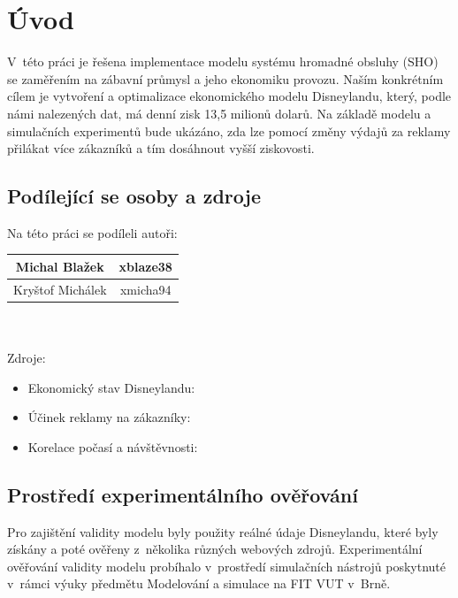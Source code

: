 
%

\chapter{Úvod}
V~této práci je řešena implementace modelu systému hromadné obsluhy (SHO) se zaměřením na zábavní průmysl a jeho ekonomiku provozu. Naším konkrétním cílem je vytvoření a optimalizace ekonomického modelu Disneylandu, který, podle námi nalezených dat, má denní zisk 13,5 milionů dolarů. Na základě modelu a simulačních experimentů bude ukázáno, zda lze pomocí změny výdajů za reklamy přilákat více zákazníků a tím dosáhnout vyšší ziskovosti.

\section{Podílející se osoby a zdroje}
Na této práci se podíleli autoři: \\
\begin{tabular}{|c|c|}
\hline
Michal Blažek & xblaze38 \\
\hline
Kryštof Michálek & xmicha94 \\
\hline
\end{tabular} \\ \\
Zdroje:
\begin{itemize}
    \item Ekonomický stav Disneylandu: \cite{michael2024}
    \item Účinek reklamy na zákazníky: \cite{smith2024}
    \item Korelace počasí a návštěvnosti: \cite{joo2012}
\end{itemize}

\section{Prostředí experimentálního ověřování}
Pro zajištění validity modelu byly použity reálné údaje Disneylandu, které byly získány a poté ověřeny z~několika různých webových zdrojů. Experimentální ověřování validity modelu probíhalo v~prostředí simulačních nástrojů poskytnuté v~rámci výuky předmětu Modelování a simulace na FIT VUT v~Brně.

